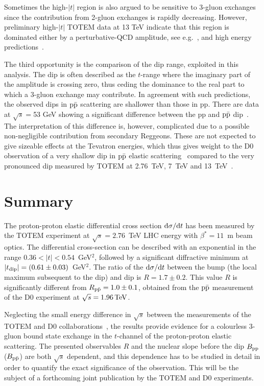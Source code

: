 \documentclass[TOTEM]{cernphprep}
\def\un#1{\,{\rm #1}}
\begin{document}
Sometimes the high-$|t|$ region is also argued to be sensitive to 3-gluon exchanges since the contribution from 2-gluon exchanges is rapidly
decreasing.  However, preliminary high-$|t|$ TOTEM data at 13 TeV indicate that this region is dominated either by a perturbative-QCD amplitude, see e.g.~\cite{Donnachie:1979yu},
and high energy predictions~\cite{Brodsky:1973kr}.

The third opportunity is the comparison of the dip range, exploited in this analysis. The dip is often described as the $t$-range where the imaginary part of the amplitude is crossing zero, thus ceding
the dominance to the real part to which a 3-gluon exchange may contribute.  In agreement with such predictions, the observed dips
in $\rm p\bar{p}$ scattering are shallower than those in pp. There are data at $\sqrt{s}=$53 GeV showing a significant difference between the pp and $\rm p\bar{p}$
dip~\cite{Amaldi:1979kd}.  The interpretation of this difference is, however, complicated due to a possible non-negligible contribution from secondary Reggeons.
These are not expected to give sizeable effects at the Tevatron energies, which thus gives weight to the D0 observation of a very shallow
dip in $\rm p\bar{p}$ elastic scattering~\cite{Abazov:2012qb} compared to the very pronounced dip measured by TOTEM at 2.76~TeV, 7~TeV and 13~TeV~\cite{Antchev:2011vs}.

\section{Summary}

The proton-proton elastic differential cross section ${\rm d}\sigma/{\rm d}t$ has been measured by the TOTEM experiment at $\sqrt{s}=2.76$~TeV LHC energy with $\beta^{*}=11$~m beam optics. 
The differential cross-section can be described with an exponential in the range $0.36<|t|<0.54$~GeV$^{2}$, followed by a significant diffractive minimum at $|t_{\rm dip}|=(0.61\pm0.03)$~GeV$^{2}$.
The ratio of the ${\rm d}\sigma/{\rm d}t$ between the bump (the local maximum subsequent to the dip) and dip is $R=1.7\pm0.2$. This value $R$ is significantly different from $R_{\rm p\bar{p}}=1.0\pm 0.1$, obtained from the $\rm p\bar{p}$ measurement of
the D0 experiment at $\sqrt s = 1.96\un{TeV}$. 

Neglecting the small energy difference in $\sqrt{s}$ between the measurements of the TOTEM and D0 collaborations~\cite{Abazov:2012qb}, the results provide evidence for a colourless 3-gluon bound state exchange in the $t$-channel of the proton-proton elastic scattering.
The presented observables $R$ and the nuclear slope before the dip $B_{\rm pp}$ ($B_{\rm p\bar{p}}$) are both $\sqrt{s}$ dependent, and this dependence has to be studied in detail in order to quantify the exact significance of the observation.
This will be the subject of a forthcoming joint publication by the TOTEM and D0 experiments.
\end{document}

